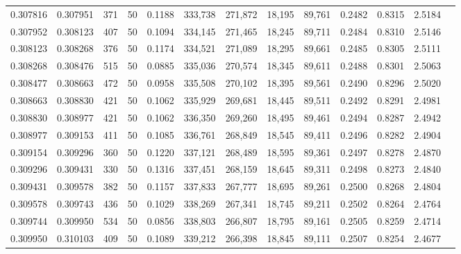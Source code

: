 \begin{tabular}{rrrrrrrrrrrrr}
0.307816 & 0.307951 &   371 &  50 &                                     0.1188 & 333,738 & 271,872 &  18,195 &  89,761 & 0.2482 & 0.8315 & 2.5184 \\
0.307952 & 0.308123 &   407 &  50 &                                     0.1094 & 334,145 & 271,465 &  18,245 &  89,711 & 0.2484 & 0.8310 & 2.5146 \\
0.308123 & 0.308268 &   376 &  50 &                                     0.1174 & 334,521 & 271,089 &  18,295 &  89,661 & 0.2485 & 0.8305 & 2.5111 \\
0.308268 & 0.308476 &   515 &  50 &                                     0.0885 & 335,036 & 270,574 &  18,345 &  89,611 & 0.2488 & 0.8301 & 2.5063 \\
0.308477 & 0.308663 &   472 &  50 &                                     0.0958 & 335,508 & 270,102 &  18,395 &  89,561 & 0.2490 & 0.8296 & 2.5020 \\
0.308663 & 0.308830 &   421 &  50 &                                     0.1062 & 335,929 & 269,681 &  18,445 &  89,511 & 0.2492 & 0.8291 & 2.4981 \\
0.308830 & 0.308977 &   421 &  50 &                                     0.1062 & 336,350 & 269,260 &  18,495 &  89,461 & 0.2494 & 0.8287 & 2.4942 \\
0.308977 & 0.309153 &   411 &  50 &                                     0.1085 & 336,761 & 268,849 &  18,545 &  89,411 & 0.2496 & 0.8282 & 2.4904 \\
0.309154 & 0.309296 &   360 &  50 &                                     0.1220 & 337,121 & 268,489 &  18,595 &  89,361 & 0.2497 & 0.8278 & 2.4870 \\
0.309296 & 0.309431 &   330 &  50 &                                     0.1316 & 337,451 & 268,159 &  18,645 &  89,311 & 0.2498 & 0.8273 & 2.4840 \\
0.309431 & 0.309578 &   382 &  50 &                                     0.1157 & 337,833 & 267,777 &  18,695 &  89,261 & 0.2500 & 0.8268 & 2.4804 \\
0.309578 & 0.309743 &   436 &  50 &                                     0.1029 & 338,269 & 267,341 &  18,745 &  89,211 & 0.2502 & 0.8264 & 2.4764 \\
0.309744 & 0.309950 &   534 &  50 &                                     0.0856 & 338,803 & 266,807 &  18,795 &  89,161 & 0.2505 & 0.8259 & 2.4714 \\
0.309950 & 0.310103 &   409 &  50 &                                     0.1089 & 339,212 & 266,398 &  18,845 &  89,111 & 0.2507 & 0.8254 & 2.4677 \\

\end{tabular}
